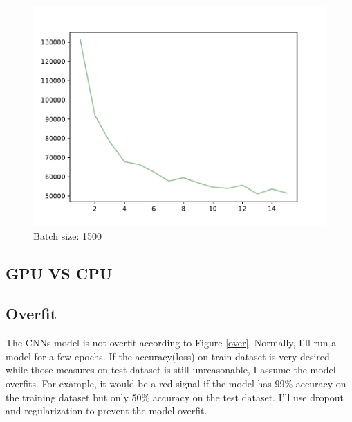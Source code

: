 \documentclass{article}
\begin{document}
\begin{figure}[!h]
{\begin{minipage}{0.21\linewidth}
  \includegraphics[scale=0.23]{imgs/test_loss_1500.pdf}
  \end{minipage}
}
\quad
{}
\caption{ Batch size: 1500}
\label{bs1500}
\end{figure}

\subsection{GPU VS CPU}

\subsection{Overfit}
The CNNs model is not overfit according to Figure \ref{over}. Normally, I'll run a model for a few epochs. If the accuracy(loss) on train dataset is very desired while those measures on test dataset is still unreasonable, I assume the model overfits. For example, it would be a red signal if the model has 99\% accuracy on the training dataset but only 50\% accuracy on the test dataset. I'll use dropout and regularization to prevent the model overfit.
\end{document}
